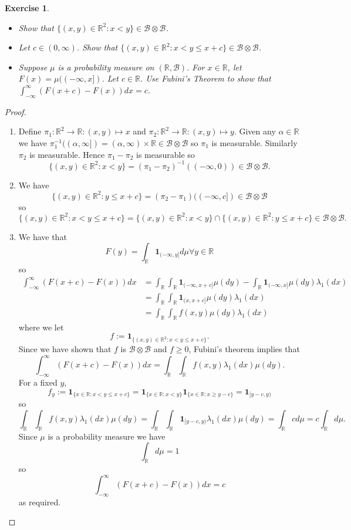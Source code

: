 \documentclass{article}
\newtheorem{exercise}[theorem]{Exercise}
\begin{document}
\begin{exercise}
\begin{itemize}
    \item[(a)] Show that $\{(x,y) \in \mathbb{R}^2 : x < y\} \in \mathcal{B} \otimes \mathcal{B}$.
    \item[(b)] Let $c \in (0,\infty)$. Show that $\{(x,y) \in \mathbb{R}^2 : x < y \leq x + c\} \in \mathcal{B} \otimes \mathcal{B}$.
    \item[(c)] Suppose $\mu$ is a probability measure on $(\mathbb{R}, \mathcal{B})$. For $x \in \mathbb{R}$, let $F(x) = \mu((-\infty, x])$. Let $c \in \mathbb{R}$. Use Fubini’s Theorem to show that $\int_{-\infty}^{\infty} (F(x+c) - F(x))dx = c$.
\end{itemize}
\end{exercise}
\begin{proof}
\begin{enumerate}
    \item[(a)] Define $\pi_1:\mathbb{R}^2\to\mathbb{R}:(x,y)\mapsto x$ and $\pi_2:\mathbb{R}^2\to\mathbb{R}:(x,y)\mapsto y$. Given any $\alpha\in\mathbb{R}$ we have $\pi_1^{-1}((\alpha,\infty])=(\alpha,\infty)\times\mathbb{R}\in\mathcal{B}\otimes\mathcal{B}$ so $\pi_1$ is measurable. Similarly $\pi_2$ is measurable. Hence $\pi_1-\pi_2$ is measurable so\[\{(x,y)\in\mathbb{R}^2:x<y\}=(\pi_1-\pi_2)^{-1}((-\infty,0))\in\mathcal{B}\otimes\mathcal{B}.\]
    \item[(b)] We have \[\{(x,y)\in\mathbb{R}^2:y\leq x+c\}=(\pi_2-\pi_1)((-\infty,c])\in\mathcal{B}\otimes\mathcal{B}\] so\[\{(x,y)\in\mathbb{R}^2:x<y\leq x+c\}=\{(x,y)\in\mathbb{R}^2:x<y\}\cap\{(x,y)\in\mathbb{R}^2:y\leq x+c\}\in\mathcal{B}\otimes\mathcal{B}.\]
    \item[(c)] We have that \[F(y)=\int_\mathbb{R}\mathbf{1}_{(-\infty,y]}d\mu\forall y\in\mathbb{R}\] so\begin{align*}\int_{-\infty}^\infty(F(x+c)-F(x))dx&=\int_\mathbb{R}\int_\mathbb{R}\mathbf{1}_{(-\infty,x+c]}\mu(dy)-\int_\mathbb{R}\mathbf{1}_{(-\infty,x]}\mu(dy) \lambda_1(dx)\\&=\int_\mathbb{R}\int_\mathbb{R}\mathbf{1}_{(x,x+c]}\mu(dy)\lambda_1(dx)\\&=\int_\mathbb{R}\int_\mathbb{R}f(x,y)\mu(dy)\lambda_1(dx)\end{align*} where we let \[f:=\mathbf{1}_{\{(x,y)\in\mathbb{R}^2:x<y\leq x+c\}}.\] Since we have shown that $f$ is $\mathcal{B}\otimes\mathcal{B}$ and $f\geq 0$, Fubini's theorem implies that\[\int_{-\infty}^\infty(F(x+c)-F(x))dx=\int_\mathbb{R}\int_\mathbb{R}f(x,y)\lambda_1(dx)\mu(dy).\] For a fixed $y$, \[f_y:=\mathbf{1}_{\{x\in\mathbb{R}:x<y\leq x+c\}}=\mathbf{1}_{\{x\in\mathbb{R}:x<y\}}\mathbf{1}_{\{x\in\mathbb{R}:x\geq y-c\}}=\mathbf{1}_{[y-c,y)}\]so\[\int_\mathbb{R}\int_\mathbb{R}f(x,y)\lambda_1(dx)\mu(dy)=\int_\mathbb{R}\int_\mathbb{R}\mathbf{1}_{[y-c,y)}\lambda_1(dx)\mu(dy)=\int_\mathbb{R}cd\mu=c\int_\mathbb{R}d\mu.\] Since $\mu$ is a probability measure we have \[\int_\mathbb{R}d\mu=1\] so \[\int_{-\infty}^\infty(F(x+c)-F(x))dx=c\] as required.
\end{enumerate}
\end{proof}
\end{document}
